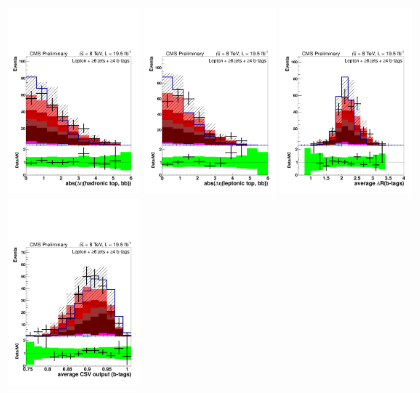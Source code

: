 \begin{figure}[hbtp]
 \begin{center}
   \includegraphics[width=0.31\textwidth]{Figures/Analysis_2_Diagrams/LJ_plots_lep/6j4t/lep_abs_dEta_hadtop_bb_6j4t_cumulative_wRatio_noLegend_lin.pdf}
   \includegraphics[width=0.31\textwidth]{Figures/Analysis_2_Diagrams/LJ_plots_lep/6j4t/lep_abs_dEta_leptop_bb_6j4t_cumulative_wRatio_noLegend_lin.pdf}
   \includegraphics[width=0.31\textwidth]{Figures/Analysis_2_Diagrams/LJ_plots_lep/6j4t/lep_ave_dR_tag_tag_6j4t_cumulative_wRatio_noLegend_lin.pdf}
   \includegraphics[width=0.31\textwidth]{Figures/Analysis_2_Diagrams/LJ_plots_lep/6j4t/lep_avg_btag_disc_btags_6j4t_cumulative_wRatio_noLegend_lin.pdf}

\end{center}
\end{figure}
